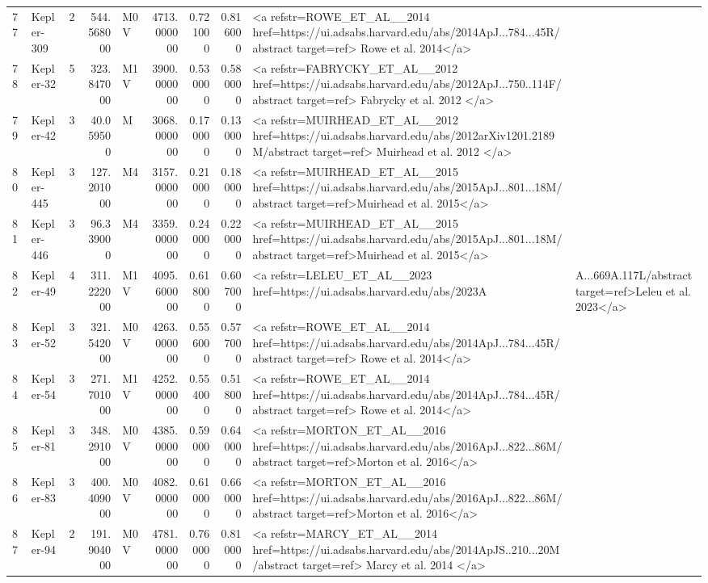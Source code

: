\begin{tabular}{llrrlrrrl}
77 & Kepler-309 & 2 & 544.568000 & M0 V & 4713.000000 & 0.721000 & 0.816000 & <a refstr=ROWE_ET_AL__2014 href=https://ui.adsabs.harvard.edu/abs/2014ApJ...784...45R/abstract target=ref> Rowe et al. 2014</a> \\
78 & Kepler-32 & 5 & 323.847000 & M1 V & 3900.000000 & 0.530000 & 0.580000 & <a refstr=FABRYCKY_ET_AL__2012 href=https://ui.adsabs.harvard.edu/abs/2012ApJ...750..114F/abstract target=ref> Fabrycky et al. 2012 </a> \\
79 & Kepler-42 & 3 & 40.059500 & M & 3068.000000 & 0.170000 & 0.130000 & <a refstr=MUIRHEAD_ET_AL__2012 href=https://ui.adsabs.harvard.edu/abs/2012arXiv1201.2189M/abstract target=ref> Muirhead et al. 2012 </a> \\
80 & Kepler-445 & 3 & 127.201000 & M4 & 3157.000000 & 0.210000 & 0.180000 & <a refstr=MUIRHEAD_ET_AL__2015 href=https://ui.adsabs.harvard.edu/abs/2015ApJ...801...18M/abstract target=ref>Muirhead et al. 2015</a> \\
81 & Kepler-446 & 3 & 96.339000 & M4 & 3359.000000 & 0.240000 & 0.220000 & <a refstr=MUIRHEAD_ET_AL__2015 href=https://ui.adsabs.harvard.edu/abs/2015ApJ...801...18M/abstract target=ref>Muirhead et al. 2015</a> \\
82 & Kepler-49 & 4 & 311.222000 & M1 V & 4095.600000 & 0.618000 & 0.607000 & <a refstr=LELEU_ET_AL__2023 href=https://ui.adsabs.harvard.edu/abs/2023A&A...669A.117L/abstract target=ref>Leleu et al. 2023</a> \\
83 & Kepler-52 & 3 & 321.542000 & M0 V & 4263.000000 & 0.556000 & 0.577000 & <a refstr=ROWE_ET_AL__2014 href=https://ui.adsabs.harvard.edu/abs/2014ApJ...784...45R/abstract target=ref> Rowe et al. 2014</a> \\
84 & Kepler-54 & 3 & 271.701000 & M1 V & 4252.000000 & 0.554000 & 0.518000 & <a refstr=ROWE_ET_AL__2014 href=https://ui.adsabs.harvard.edu/abs/2014ApJ...784...45R/abstract target=ref> Rowe et al. 2014</a> \\
85 & Kepler-81 & 3 & 348.291000 & M0 V & 4385.000000 & 0.590000 & 0.640000 & <a refstr=MORTON_ET_AL__2016 href=https://ui.adsabs.harvard.edu/abs/2016ApJ...822...86M/abstract target=ref>Morton et al. 2016</a> \\
86 & Kepler-83 & 3 & 400.409000 & M0 V & 4082.000000 & 0.610000 & 0.660000 & <a refstr=MORTON_ET_AL__2016 href=https://ui.adsabs.harvard.edu/abs/2016ApJ...822...86M/abstract target=ref>Morton et al. 2016</a> \\
87 & Kepler-94 & 2 & 191.904000 & M0 V & 4781.000000 & 0.760000 & 0.810000 & <a refstr=MARCY_ET_AL__2014 href=https://ui.adsabs.harvard.edu/abs/2014ApJS..210...20M/abstract target=ref> Marcy et al. 2014 </a> \\

\end{tabular}
